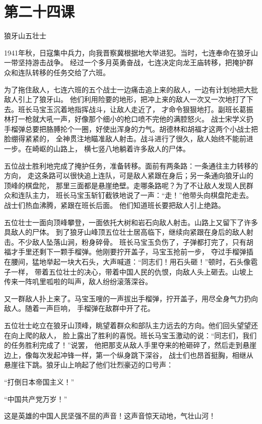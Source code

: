 \documentclass[12pt,UTF8]{ctexbook}
\begin{document}
\section{第二十四课}

狼牙山五壮士

1941年秋，日寇集中兵力，向我晋察冀根据地大举进犯。当时，七连奉命在狼牙山一带坚持游击战争。
经过一个多月英勇奋战，七连决定向龙王庙转移，把掩护群众和连队转移的任务交给了六班。

为了拖住敌人，七连六班的五个战士一边痛击追上来的敌人，一边有计划地把大批敌人引上了狼牙山。
他们利用险要的地形，把冲上来的敌人一次又一次地打了下去。班长马宝玉沉着地指挥战斗，让敌人走近了，
才命令狠狠地打。副班长葛振林打一枪就大吼一声，好像那个细小的枪口喷不完他的满腔怒火。
战士宋学义扔手榴弹总要把胳膊抡个一圈，好使出浑身的力气。胡德林和胡福才这两个小战士把脸绷得紧紧的，
全神贯注地瞄准敌人射击。战斗进行了很久，敌人始终不能前进一步。在崎岖的山路上，
横七竖八地躺着许多敌人的尸体。

五位战士胜利地完成了掩护任务，准备转移。面前有两条路：一条通往主力转移的方向，
走这条路可以很快追上连队，可是敌人紧跟在身后；另一条通向狼牙山的顶峰的棋盘陀，
那里三面都是悬崖绝壁。走哪条路呢？为了不让敌人发现人民群众和连队主力，
班长马宝玉斩钉截铁地说了一声：“走！”他带头向棋盘陀走去。战士们热血沸腾，紧跟在班长后面。
他们知道班长要把敌人引上绝路。

五位壮士一面向顶峰攀登，一面依托大树和岩石向敌人射击。山路上又留下了许多具敌人的尸体。
到了狼牙山峰顶五位壮士居高临下，继续向紧跟在身后的敌人射击。不少敌人坠落山涧，粉身碎骨。
班长马宝玉负伤了，子弹都打完了，只有胡福才手里还剩下一颗手榴弹。他刚要拧开盖子，马宝玉抢前一步，
夺过手榴弹插在腰间，猛地举起一块大石头，大声喊道：“同志们！用石头砸！”顿时，石头像雹子一样，
带着五位壮士的决心，带着中国人民的仇恨，向敌人头上砸去。山坡上传来一阵叽里呱啦的叫声，敌人纷纷滚落深谷。

又一群敌人扑上来了。马宝玉嗖的一声拔出手榴弹，拧开盖子，用尽全身气力扔向敌人。随着一声巨响，
手榴弹在敌群中开了花。

五位壮士屹立在狼牙山顶峰，眺望着群众和部队主力远去的方向。他们回头望望还在向上爬的敌人，
脸上露出了胜利的喜悦。班长马宝玉激动的说：“同志们，我们的任务胜利完成了！”说罢，
他把那支从敌人手里夺来的枪砸碎了，然后走到悬崖边上，像每次发起冲锋一样，第一个纵身跳下深谷，
战士们也昂首挺胸，相继从悬崖往下跳。狼牙山上响起了他们壮烈豪迈的口号声：

“打倒日本帝国主义！”

“中国共产党万岁！”

这是英雄的中国人民坚强不屈的声音！这声音惊天动地，气壮山河！
\end{document}
